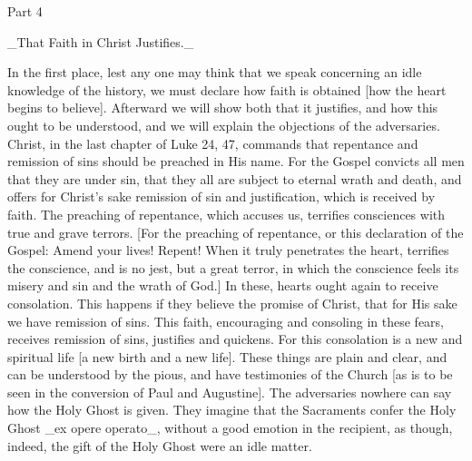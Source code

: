 Part 4


_That Faith in Christ Justifies._

In the first place, lest any one may think that we speak concerning
an idle knowledge of the history, we must declare how faith is
obtained [how the heart begins to believe].  Afterward we will show
both that it justifies, and how this ought to be understood, and we
will explain the objections of the adversaries.  Christ, in the last
chapter of Luke 24, 47, commands that repentance and remission of
sins should be preached in His name.  For the Gospel convicts all men
that they are under sin, that they all are subject to eternal wrath
and death, and offers for Christ's sake remission of sin and
justification, which is received by faith.  The preaching of
repentance, which accuses us, terrifies consciences with true and
grave terrors.  [For the preaching of repentance, or this declaration
of the Gospel: Amend your lives!  Repent!  When it truly penetrates
the heart, terrifies the conscience, and is no jest, but a great
terror, in which the conscience feels its misery and sin and the
wrath of God.] In these, hearts ought again to receive consolation.
This happens if they believe the promise of Christ, that for His sake
we have remission of sins.  This faith, encouraging and consoling in
these fears, receives remission of sins, justifies and quickens.  For
this consolation is a new and spiritual life [a new birth and a new
life].  These things are plain and clear, and can be understood by
the pious, and have testimonies of the Church [as is to be seen in
the conversion of Paul and Augustine].  The adversaries nowhere can
say how the Holy Ghost is given.  They imagine that the Sacraments
confer the Holy Ghost _ex opere operato_, without a good emotion in
the recipient, as though, indeed, the gift of the Holy Ghost were an
idle matter.

